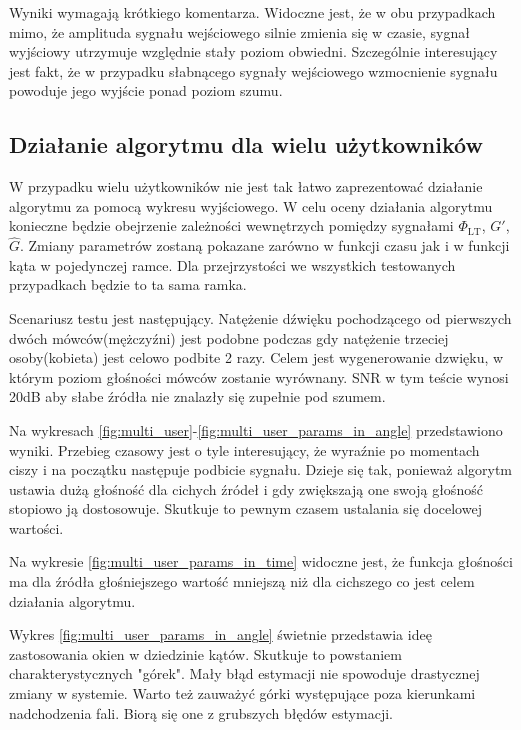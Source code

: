 \noindent Wyniki wymagają krótkiego komentarza. Widoczne jest, że w obu przypadkach mimo, że amplituda sygnału wejściowego silnie zmienia się w czasie, sygnał wyjściowy utrzymuje względnie stały poziom obwiedni. Szczególnie interesujący jest fakt, że w przypadku słabnącego sygnały wejściowego wzmocnienie sygnału powoduje jego wyjście ponad poziom szumu.

\subsection{Działanie algorytmu dla wielu użytkowników}

W przypadku wielu użytkowników nie jest tak łatwo zaprezentować działanie algorytmu za pomocą wykresu wyjściowego. W celu oceny działania algorytmu konieczne będzie obejrzenie zależności wewnętrzych pomiędzy sygnałami $\Phi_{\mathrm{LT}}$, $G'$, $\widehat{G}$. Zmiany parametrów zostaną pokazane zarówno w funkcji czasu jak i w funkcji kąta w pojedynczej ramce. Dla przejrzystości we wszystkich testowanych przypadkach będzie to ta sama ramka.

\noindent Scenariusz testu jest następujący. Natężenie dźwięku pochodzącego od pierwszych dwóch mówców(mężczyźni) jest podobne podczas gdy natężenie trzeciej osoby(kobieta) jest celowo podbite 2 razy. Celem jest wygenerowanie dzwięku, w którym poziom głośności mówców zostanie wyrównany. SNR w tym teście wynosi 20dB aby słabe źródła nie znalazły się zupełnie pod szumem.

\noindent Na wykresach \ref{fig:multi_user}-\ref{fig:multi_user_params_in_angle} przedstawiono wyniki. Przebieg czasowy jest o tyle interesujący, że wyraźnie po momentach ciszy i na początku następuje podbicie sygnału. Dzieje się tak, ponieważ algorytm ustawia dużą głośność dla cichych źródeł i gdy zwiększają one swoją głośność stopiowo ją dostosowuje. Skutkuje to pewnym czasem ustalania się docelowej wartości.

\noindent Na wykresie \ref{fig:multi_user_params_in_time} widoczne jest, że funkcja głośności ma dla źródła głośniejszego wartość mniejszą niż dla cichszego co jest celem działania algorytmu.

\noindent Wykres \ref{fig:multi_user_params_in_angle} świetnie przedstawia ideę zastosowania okien w dziedzinie kątów. Skutkuje to powstaniem charakterystycznych "górek". Mały błąd estymacji nie spowoduje drastycznej zmiany w systemie. Warto też zauważyć górki występujące poza kierunkami nadchodzenia fali. Biorą się one z grubszych błędów estymacji.

